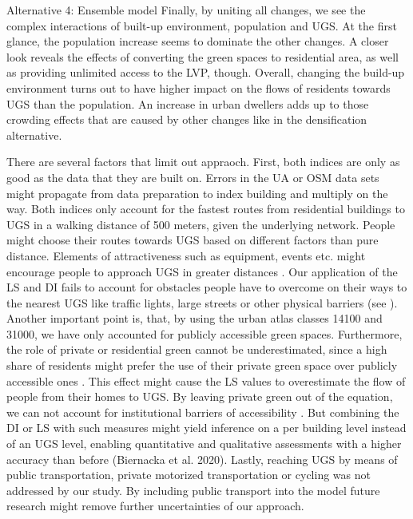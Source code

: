 \documentclass[10pt]{article}
\begin{document}
Alternative 4: Ensemble model
Finally, by uniting all changes, we see the complex interactions of built-up environment, population and UGS.
At the first glance, the population increase seems to dominate the other changes.
A closer look reveals the effects of converting the green spaces to residential area, as well as providing unlimited access to the LVP, though.
Overall, changing the build-up environment turns out to have higher impact on the flows of residents towards UGS than the population.
An increase in urban dwellers adds up to those crowding effects that are caused by other changes like in the densification alternative. 

There are several factors that limit out appraoch.
First, both indices are only as good as the data that they are built on. 
Errors in the UA or OSM data sets might propagate from data preparation to index building and multiply on the way. 
Both indices only account for the fastest routes from residential buildings to UGS in a walking distance of 500 meters, given the underlying network.
People might choose their routes towards UGS based on different factors than pure distance. Elements of attractiveness such as equipment, events etc. might encourage people to approach UGS in greater distances \citep{Biernacka.2018, Biernacka.2020}.
Our application of the LS and DI fails to account for obstacles people have to overcome on their ways to the nearest UGS like traffic lights, large streets or other physical barriers (see \cite{Barber.2021}). 
Another important point is, that, by using the urban atlas classes 14100 and 31000, we have only accounted for publicly accessible green spaces.
Furthermore, the role of private or residential green cannot be underestimated, since a high share of residents might prefer the use of their private green space over publicly accessible ones \citep{Chiesura.2004, Saumel.2021}.
This effect might cause the LS values to overestimate the flow of people from their homes to UGS.
By leaving private green out of the equation, we can not account for institutional barriers of accessibility \citep{Wolff.2021, Biernacka.2018}.
But combining the DI or LS with such measures might yield inference on a per building level instead of an UGS level, enabling quantitative and qualitative assessments with a higher accuracy than before (Biernacka et al. 2020). 
Lastly, reaching UGS by means of public transportation, private motorized transportation or cycling was not addressed by our study.
By including public transport into the model future research might remove further uncertainties of our approach.
\end{document}
